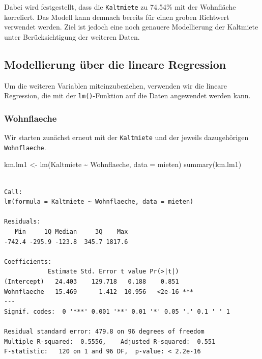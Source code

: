 \documentclass[
  a4paper,
  DIV=11]{scrartcl}
\newenvironment{Shaded}{\begin{snugshade}}{\end{snugshade}}
\newcommand{\AttributeTok}[1]{\textcolor[rgb]{0.40,0.45,0.13}{#1}}
\newcommand{\FunctionTok}[1]{\textcolor[rgb]{0.28,0.35,0.67}{#1}}
\newcommand{\NormalTok}[1]{\textcolor[rgb]{0.00,0.23,0.31}{#1}}
\newcommand{\OtherTok}[1]{\textcolor[rgb]{0.00,0.23,0.31}{#1}}
\newcommand{\SpecialCharTok}[1]{\textcolor[rgb]{0.37,0.37,0.37}{#1}}
\begin{document}
Dabei wird festgestellt, dass die \texttt{Kaltmiete} zu 74.54\% mit der
Wohnfläche korreliert. Das Modell kann demnach bereits für einen groben
Richtwert verwendet werden. Ziel ist jedoch eine noch genauere
Modellierung der Kaltmiete unter Berücksichtigung der weiteren Daten.

\hypertarget{modellierung-uxfcber-die-lineare-regression}{%
\subsection{Modellierung über die lineare
Regression}\label{modellierung-uxfcber-die-lineare-regression}}

Um die weiteren Variablen miteinzubeziehen, verwenden wir die lineare
Regression, die mit der \texttt{lm()}-Funktion auf die Daten angewendet
werden kann.

\hypertarget{wohnflaeche}{%
\subsubsection{Wohnflaeche}\label{wohnflaeche}}

Wir starten zunächst erneut mit der \texttt{Kaltmiete} und der jeweils
dazugehörigen \texttt{Wohnflaeche}.

\begin{Shaded}
\begin{Highlighting}[]
\NormalTok{km.lm1 }\OtherTok{\textless{}{-}} \FunctionTok{lm}\NormalTok{(Kaltmiete }\SpecialCharTok{\textasciitilde{}}\NormalTok{ Wohnflaeche, }\AttributeTok{data =}\NormalTok{ mieten)}
\FunctionTok{summary}\NormalTok{(km.lm1)}
\end{Highlighting}
\end{Shaded}

\begin{verbatim}

Call:
lm(formula = Kaltmiete ~ Wohnflaeche, data = mieten)

Residuals:
   Min     1Q Median     3Q    Max 
-742.4 -295.9 -123.8  345.7 1817.6 

Coefficients:
            Estimate Std. Error t value Pr(>|t|)    
(Intercept)   24.403    129.718   0.188    0.851    
Wohnflaeche   15.469      1.412  10.956   <2e-16 ***
---
Signif. codes:  0 '***' 0.001 '**' 0.01 '*' 0.05 '.' 0.1 ' ' 1

Residual standard error: 479.8 on 96 degrees of freedom
Multiple R-squared:  0.5556,    Adjusted R-squared:  0.551 
F-statistic:   120 on 1 and 96 DF,  p-value: < 2.2e-16
\end{verbatim}
\end{document}
